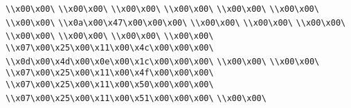 \verb|\\x00\x00\|\newline
\verb|\\x00\x00\|\newline
\verb|\\x00\x00\|\newline
\verb|\\x00\x00\|\newline
\verb|\\x00\x00\|\newline
\verb|\\x00\x00\|\newline
\verb|\\x00\x00\|\newline
\verb|\\x0a\x00\x47\x00\x00\x00\|\newline
\verb|\\x00\x00\|\newline
\verb|\\x00\x00\|\newline
\verb|\\x00\x00\|\newline
\verb|\\x00\x00\|\newline
\verb|\\x00\x00\|\newline
\verb|\\x00\x00\|\newline
\verb|\\x00\x00\|\newline
\verb|\\x07\x00\x25\x00\x11\x00\x4c\x00\x00\x00\|\newline
\verb|\\x0d\x00\x4d\x00\x0e\x00\x1c\x00\x00\x00\|\newline
\verb|\\x00\x00\|\newline
\verb|\\x00\x00\|\newline
\verb|\\x07\x00\x25\x00\x11\x00\x4f\x00\x00\x00\|\newline
\verb|\\x07\x00\x25\x00\x11\x00\x50\x00\x00\x00\|\newline
\verb|\\x07\x00\x25\x00\x11\x00\x51\x00\x00\x00\|\newline
\verb|\\x00\x00\|\newline
